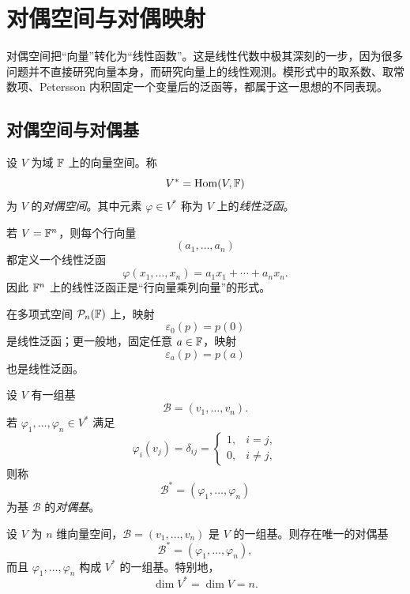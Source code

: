 \section{对偶空间与对偶映射}

对偶空间把“向量”转化为“线性函数”。这是线性代数中极其深刻的一步，因为很多问题并不直接研究向量本身，而研究向量上的线性观测。模形式中的取系数、取常数项、Petersson 内积固定一个变量后的泛函等，都属于这一思想的不同表现。

\subsection{对偶空间与对偶基}

\begin{definition}
设 $V$ 为域 $\mathbb{F}$ 上的向量空间。称
\[
  V^*=\mathrm{Hom}(V,\mathbb{F})
\]
为 $V$ 的\emph{对偶空间}。其中元素 $\varphi\in V^*$ 称为 $V$ 上的\emph{线性泛函}。
\end{definition}

\begin{example}
若 $V=\mathbb{F}^n$，则每个行向量
\[
  (a_1,\dots,a_n)
\]
都定义一个线性泛函
\[
  \varphi(x_1,\dots,x_n)=a_1x_1+\cdots+a_nx_n.
\]
因此 $\mathbb{F}^n$ 上的线性泛函正是“行向量乘列向量”的形式。
\end{example}

\begin{example}
在多项式空间 $\mathcal P_n(\mathbb{F})$ 上，映射
\[
  \varepsilon_0(p)=p(0)
\]
是线性泛函；更一般地，固定任意 $a\in\mathbb{F}$，映射
\[
  \varepsilon_a(p)=p(a)
\]
也是线性泛函。
\end{example}

\begin{definition}
设 $V$ 有一组基
\[
  \mathcal B=(v_1,\dots,v_n).
\]
若 $\varphi_1,\dots,\varphi_n\in V^*$ 满足
\[
  \varphi_i(v_j)=\delta_{ij}
  =\begin{cases}
    1,& i=j,\\
    0,& i\neq j,
  \end{cases}
\]
则称
\[
  \mathcal B^*=(\varphi_1,\dots,\varphi_n)
\]
为基 $\mathcal B$ 的\emph{对偶基}。
\end{definition}

\begin{theorem}
设 $V$ 为 $n$ 维向量空间，$\mathcal B=(v_1,\dots,v_n)$ 是 $V$ 的一组基。则存在唯一的对偶基
\[
  \mathcal B^*=(\varphi_1,\dots,\varphi_n),
\]
而且 $\varphi_1,\dots,\varphi_n$ 构成 $V^*$ 的一组基。特别地，
\[
  \dim V^*=\dim V=n.
\]
\end{theorem}

